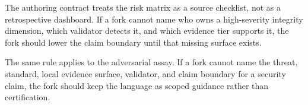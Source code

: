 \documentclass[
]{article}
\begin{document}
The authoring contract treats the risk matrix as a source checklist, not
as a retrospective dashboard. If a fork cannot name who owns a
high-severity integrity dimension, which validator detects it, and which
evidence tier supports it, the fork should lower the claim boundary
until that missing surface exists.

The same rule applies to the adversarial assay. If a fork cannot name
the threat, standard, local evidence surface, validator, and claim
boundary for a security claim, the fork should keep the language as
scoped guidance rather than certification.



\clearpage


\end{document}
